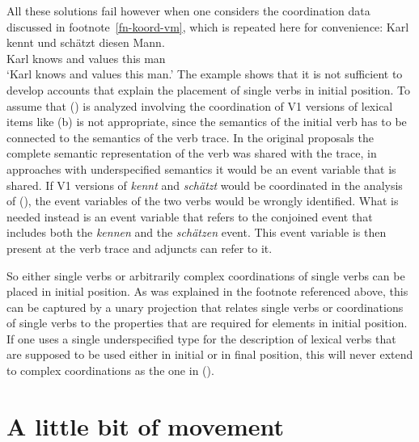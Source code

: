 \begin{exe}
\begin{xlist}
All these solutions fail however when one considers the coordination data discussed in
footnote~\vref{fn-koord-vm}, which is repeated here for convenience:
\ea
\gll Karl kennt und schätzt diesen Mann.\\
     Karl knows and values this man\\
\glt `Karl knows and values this man.'
\z
The example shows that it is not sufficient to develop accounts that explain the placement of single
verbs in initial position. To assume that () is analyzed involving the coordination of V1 versions of lexical items like (b) is not
appropriate, since the semantics of the initial verb has to be connected to the semantics of the
verb trace. In the original proposals the complete semantic representation of the verb was shared
with the trace, in approaches with underspecified semantics it would be an event variable that is
shared. If V1 versions of \emph{kennt} and \emph{schätzt} would be coordinated in the analysis of
(), the event variables of the two verbs would be wrongly identified. What is needed instead is an
event variable that refers to the conjoined event that includes both the \emph{kennen} and the
\emph{schätzen} event. This event variable is then present at the verb trace and adjuncts can refer
to it.

So either single verbs or arbitrarily complex coordinations of single verbs
can be placed in initial position. As was explained in the footnote referenced above, this can be
captured by a unary projection that relates single verbs or coordinations of single verbs to the
properties that are required for elements in initial position. If one uses a single underspecified
type for the description of lexical verbs that are supposed to be used either in initial or in final
position, this will never extend to complex coordinations as the one in ().


\section{A little bit of movement}
\label{crysmann}


\end{xlist}
\end{exe}
